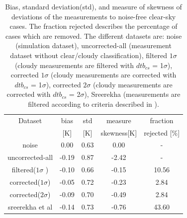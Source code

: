 \documentclass[12pt]{article}
\begin{document}
%

\begin{table}[!bt]
	\centering
	\begin{tabular}[b]{c|c|c|c|c}
		Dataset  		  &   bias &   std &   measure  & fraction  \\
							&   [K]  &   [K] & skewness[K] & rejected [\%]\\
		\hline
		noise             		&   0.00 &  0.63 &               0.00 &                - \\
		uncorrected-all       	&  -0.19 &  0.87 &              -2.42 &                - \\
		filtered($1\sigma$ ) 	&  -0.10 &  0.66 &              -0.15 &               10.56 \\
		corrected($1\sigma$) 	&  -0.05 &  0.72 &              -0.23 &                2.84 \\
		corrected($2\sigma$) 	&  -0.09 &  0.70 &              -0.49 &                2.84 \\
		sreerekha et al   		&  -0.14 &  0.73 &              -0.76 &               43.60 \\
		\hline
	\end{tabular}
	\caption{Bias, standard deviation(std), and measure of skewness of deviations of the measurements to noise-free clear-sky cases. The fraction rejected describes the percentage of cases which are removed. The different datasets are: noise (simulation dataset), uncorrected-all (measurement dataset without clear/cloudy classification), filtered $1\sigma$ (cloudy measurements are filtered with $dtb_{cs}$ = 1$\sigma$), corrected $1\sigma$ (cloudy measurements are corrected with $dtb_{cs}$ = 1$\sigma$), corrected $2\sigma$ (cloudy measurements are corrected with $dtb_{cs}$ = 2$\sigma$), Sreerekha (measurements are filtered according to criteria described in \cite{rekha2012potential}).   }
	\label{tab:correction:stats:34:42}
\end{table}
%
\end{document}
